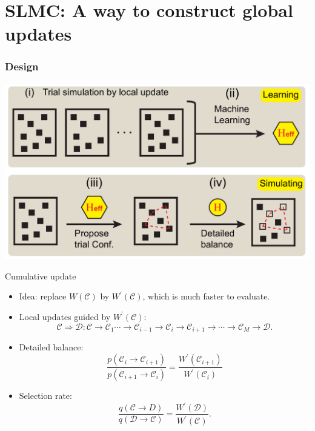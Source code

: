 \documentclass[xcolor=table, 10pt, aspectratio=43]{beamer}
\begin{document}
\section{SLMC: A way to construct global updates}

\begin{frame}
  \frametitle{Design}
  \begin{center}
    \includegraphics[width=\textwidth]{slmc-design}
  \end{center}
\end{frame}

\begin{frame}{Cumulative update}
  \begin{itemize}
    \item Idea: replace $W(\mathcal C)$ by $W^\prime(\mathcal C)$, which is much faster to evaluate.
    \item Local updates guided by $W^\prime(\mathcal C)$:
    \[\mathcal C\Rightarrow\mathcal D:
    \mathcal C\rightarrow\mathcal C_1\cdots\rightarrow\mathcal C_{i-1}\rightarrow\mathcal C_i\rightarrow\mathcal C_{i+1}\rightarrow\cdots\rightarrow\mathcal C_M\rightarrow\mathcal D.\]
    \item Detailed balance:
    \[\frac{p(\mathcal C_i\rightarrow\mathcal C_{i+1})}{p(\mathcal C_{i+1}\rightarrow\mathcal C_i)}=\frac{W^\prime(\mathcal C_{i+1})}{W^\prime(\mathcal C_i)}\]
    \item Selection rate:
    \[\frac{q(\mathcal C\rightarrow D)}
    {q(\mathcal D\rightarrow\mathcal C)}
    =\frac{W^\prime(\mathcal D)}{W^\prime(\mathcal C)}.\]
  \end{itemize}
\end{frame}
\end{document}
